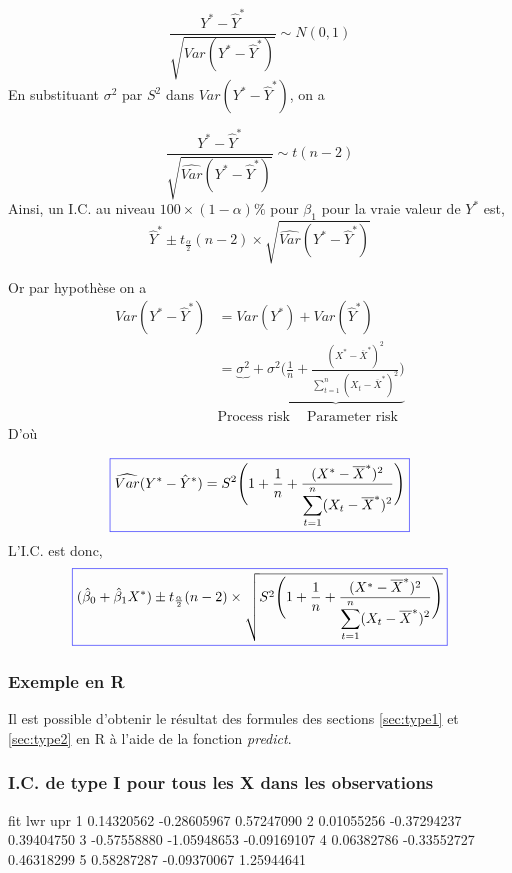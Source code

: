 \documentclass[11pt,french]{report}
\begin{document}
$$
\frac{Y^* - \hat{Y}^*}{\sqrt{Var(Y^* - \hat{Y}^*)}} \sim N(0,1)
$$
En substituant $\sigma^2$ par $S^2$ dans $Var(Y^* - \hat{Y}^*)$, on a

$$
\frac{Y^* - \hat{Y}^*}{\sqrt{\widehat{Var}(Y^* - \hat{Y}^*)}} \sim t(n-2)
$$
Ainsi, un I.C. au niveau $100 \times (1 - \alpha)\%$ pour $\beta_1$  pour la vraie valeur de $Y^*$ est,
$$
\hat{Y}^* \pm t_{\frac{\alpha}{2}}(n-2)\times \sqrt{\widehat{Var}(Y^* - \hat{Y}^*)}
$$

Or par hypothèse on a
\begin{align*}
Var(Y^* - \hat{Y}^*) &= Var(Y^*) + Var(\hat{Y}^*) \\
&= \underbrace{\sigma^2} +\underbrace{\sigma^2\Bigg( \frac{1}{n} + \frac{(X^* - \overline{X}^*)^2}{\displaystyle\sum_{t=1}^n (X_t - \overline{X}^*)^2}\Bigg)}  \\
&   \text{Process risk }\ \ \ \  \text{Parameter risk}
\end{align*}
D'où 

\begin{equation}
\label{eq:var2*}
\color{blue}
\boxed{\color{black}
\widehat{Var}(Y^* - \hat{Y}^*) = S^2 \Bigg(1 + \frac{1}{n} + \frac{(X^* - \overline{X}^*)^2}{\displaystyle\sum_{t=1}^n (X_t - \overline{X}^*)^2}\Bigg)  
}
\end{equation}
L'I.C. est donc,
\begin{equation}
\label{eq:IC3}
\color{blue}
\boxed{\color{black}
(\hat{\beta}_0 + \hat{\beta}_1X^*) \pm t_{\frac{\alpha}{2}}(n-2)\times \sqrt{S^2 \Bigg(1 + \frac{1}{n} + \frac{(X^* - \overline{X}^*)^2}{\displaystyle\sum_{t=1}^n (X_t - \overline{X}^*)^2}\Bigg)}  
}
\end{equation}

\subsubsection*{Exemple en R}
Il est possible d'obtenir le résultat des formules des sections \ref{sec:type1} et \ref{sec:type2} en R à l'aide de la fonction \emph{predict}.

\subsubsection*{I.C. de type I pour tous les X dans les observations}
\begin{Schunk}
\begin{Soutput}
          fit         lwr         upr
1  0.14320562 -0.28605967  0.57247090
2  0.01055256 -0.37294237  0.39404750
3 -0.57558880 -1.05948653 -0.09169107
4  0.06382786 -0.33552727  0.46318299
5  0.58287287 -0.09370067  1.25944641
\end{Soutput}
\end{Schunk}
\end{document}
